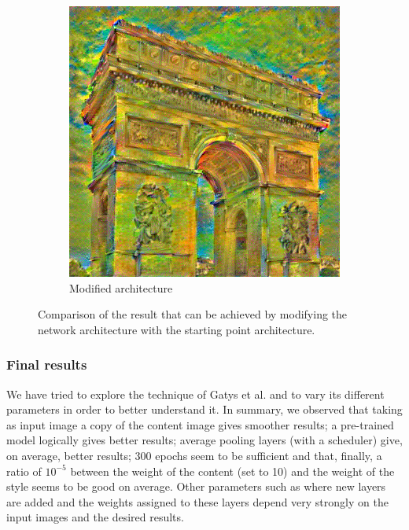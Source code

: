 \documentclass[twocolumn,superscriptaddress,aps,floatfix, nofootinbib]{revtex4-1}
\begin{document}
\begin{figure}[ht]
\begin{subfigure}[b]{0.22\textwidth}
            \includegraphics[width=\textwidth]{resources/png/layers/layers_nicer.png}
            \caption{Modified architecture}
            \label{fig:added.layer.result}
        \end{subfigure}
        \caption{Comparison of the result that can be achieved by modifying the network architecture with the starting point architecture.}
    \end{figure}
    
    \subsubsection{Final results}
    
    We have tried to explore the technique of Gatys et al. and to vary its different parameters in order to better understand it. In summary, we observed that taking as input image a copy of the content image gives smoother results; a pre-trained model logically gives better results; average pooling layers (with a scheduler) give, on average, better results; 300 epochs seem to be sufficient and that, finally, a ratio of $10^{-5}$ between the weight of the content (set to 10) and the weight of the style seems to be good on average. Other parameters such as where new layers are added and the weights assigned to these layers depend very strongly on the input images and the desired results.\\
    
\end{document}
